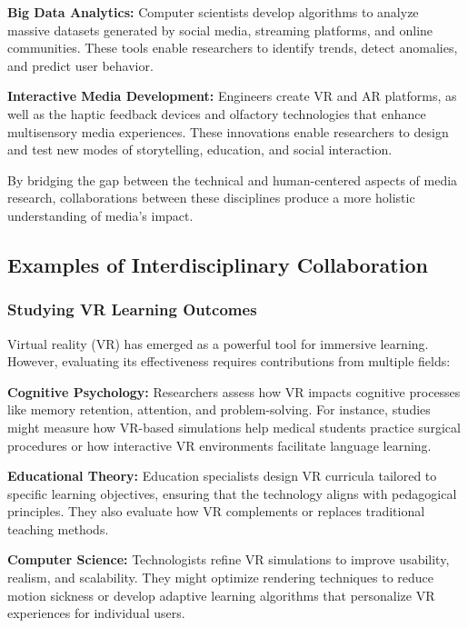 \documentclass[
]{book}
\begin{document}
\textbf{Big Data Analytics:} Computer scientists develop algorithms to analyze massive datasets generated by social media, streaming platforms, and online communities. These tools enable researchers to identify trends, detect anomalies, and predict user behavior.

\textbf{Interactive Media Development:} Engineers create VR and AR platforms, as well as the haptic feedback devices and olfactory technologies that enhance multisensory media experiences. These innovations enable researchers to design and test new modes of storytelling, education, and social interaction.

By bridging the gap between the technical and human-centered aspects of media research, collaborations between these disciplines produce a more holistic understanding of media's impact.

\subsection*{Examples of Interdisciplinary Collaboration}\label{examples-of-interdisciplinary-collaboration}

\subsubsection*{Studying VR Learning Outcomes}\label{studying-vr-learning-outcomes}

Virtual reality (VR) has emerged as a powerful tool for immersive learning. However, evaluating its effectiveness requires contributions from multiple fields:

\textbf{Cognitive Psychology:} Researchers assess how VR impacts cognitive processes like memory retention, attention, and problem-solving. For instance, studies might measure how VR-based simulations help medical students practice surgical procedures or how interactive VR environments facilitate language learning.

\textbf{Educational Theory:} Education specialists design VR curricula tailored to specific learning objectives, ensuring that the technology aligns with pedagogical principles. They also evaluate how VR complements or replaces traditional teaching methods.

\textbf{Computer Science:} Technologists refine VR simulations to improve usability, realism, and scalability. They might optimize rendering techniques to reduce motion sickness or develop adaptive learning algorithms that personalize VR experiences for individual users.
\end{document}
